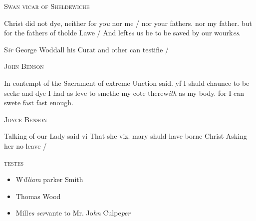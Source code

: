 \documentclass[12pt, a4paper]{book}
\begin{document}
		\ifthenelse{\isodd{\thepage}}
		{\reversemarginpar}
		{\normalmarginpar}
		
 
 

            
            	
				\begin{center} \begin{large} {\scshape Swan vicar of Sheldewiche } \end{large} \end{center}
			
 
 	
				\marginpar[\vspace{0.5cm}{\textcolor{Gray}{n}}]{}
			
 	
		\ifthenelse{\isodd{\thepage}}
		{\reversemarginpar}
		{\normalmarginpar}
		Christ did not dye, neither for yo\textit{u} nor me / nor
 your fathers. nor my father. but for the fathers
 of tholde Lawe / And left\textit{es} us be to be saved
 	by our wourk\textit{es}.

		\ifthenelse{\isodd{\thepage}}
		{\reversemarginpar}
		{\normalmarginpar}
		S\textit{ir} George Woddall his Curat and other can
 	testifie /
 

            
            	
				\begin{center} \begin{large} {\scshape John Benson} \end{large} \end{center}
			

	
		\ifthenelse{\isodd{\thepage}}
		{\reversemarginpar}
		{\normalmarginpar}
		In contempt of the Sacrament of extreme Unction
 said. yf I shuld chaunce to be seeke and dye
 I had as leve to smethe my cote therew\textit{ith}
	as my body. for I can swete fast fast
			 enough.

            
            
            	
				\begin{center} \begin{large} {\scshape Joyce Benson} \end{large} \end{center}
			

		\ifthenelse{\isodd{\thepage}}
		{\reversemarginpar}
		{\normalmarginpar}
		Talking of our Lady said vi That she viz. mary
 shuld have borne Christ Asking her no leave /
 

	\begin{center} {\scshape testes} \end{center}\begin{itemize}
		
		\item[]W\textit{illiam} parker Smith
		\item[]Thomas Wood
		\item[]Mill\textit{es} \textit{ser}vante to Mr. Jo\textit{hn }Culpe\textit{per}
	\end{itemize}
	
\end{document}
